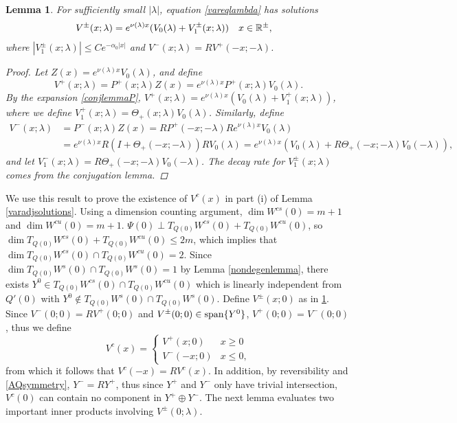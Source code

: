 \documentclass[10pt,reqno]{amsart}
\theoremstyle{plain}
\newtheorem{lemma}[theorem]{Lemma}
\theoremstyle{definition}
\theoremstyle{remark}
\numberwithin{theorem}{section}
\numberwithin{equation}{section}
\begin{document}
\begin{lemma}\label{lemma:Vpm}
For sufficiently small $|\lambda|$, equation \cref{vareqlambda} has solutions
\begin{align}\label{Vpmlambda}
V^\pm(x; \lambda) &= e^{\nu(\lambda)x}(V_0(\lambda) + V_1^\pm(x; \lambda)) && x \in \mathbb{R}^\pm,
\end{align}
where $|V_1^\pm(x; \lambda)| \leq C e^{-\alpha_0 |x|}$ and $V^-(x; \lambda) = R V^+(-x; -\lambda)$.
\begin{proof}
Let $Z(x) = e^{\nu(\lambda)x}V_0(\lambda)$, and define
\begin{equation}\label{defVplus}
V^+(x; \lambda) = P^+(x; \lambda) Z(x) = e^{\nu(\lambda)x}P^+(x; \lambda)V_0(\lambda).
\end{equation}
By the expansion \eqref{conjlemmaP}, $V^+(x; \lambda) = e^{\nu(\lambda)x}( V_0(\lambda) + V_1^+(x; \lambda))$, where we define $V_1^+(x; \lambda) = \Theta_+(x; \lambda) V_0(\lambda)$. Similarly, define 
\begin{align*}
V^-(x; \lambda) &= P^-(x; \lambda) Z(x) = RP^+(-x; -\lambda)R e^{\nu(\lambda)x} V_0(\lambda) \\
&= e^{\nu(\lambda)x} R(I + \Theta_+(-x; -\lambda))R V_0(\lambda) = e^{\nu(\lambda)x}( V_0(\lambda) + R\Theta_+(-x; -\lambda) V_0(-\lambda) ),
\end{align*}
and let $V_1^-(x; \lambda) = R\Theta_+(-x; -\lambda) V_0(-\lambda)$. The decay rate for $V_1^\pm(x; \lambda)$ comes from the conjugation lemma.
\end{proof}
\end{lemma}

We use this result to prove the existence of $V^c(x)$ in part (i) of Lemma \ref{varadjsolutions}. Using a dimension counting argument, $\dim W^{cs}(0) = m + 1$ and $\dim W^{cu}(0) = m + 1$. $\Psi(0) \perp T_{Q(0)}W^{cs}(0) + T_{Q(0)}W^{cu}(0)$, so $\dim T_{Q(0)}W^{cs}(0) + T_{Q(0)}W^{cu}(0) \leq 2m$, which implies that $\dim T_{Q(0)}W^{cs}(0) \cap T_{Q(0)}W^{cu}(0) = 2$. Since $\dim T_{Q(0)}W^s(0) \cap T_{Q(0)}W^s(0) = 1$ by Lemma \ref{nondegenlemma}, there exists $Y^0 \in T_{Q(0)}W^{cs}(0) \cap T_{Q(0)}W^{cu}(0)$ which is linearly independent from $Q'(0)$ with $Y^0 \notin T_{Q(0)}W^s(0) \cap T_{Q(0)}W^s(0)$. Define $V^\pm(x; 0)$ as in \cref{lemma:Vpm}. Since $V^-(0; 0) = R V^+(0; 0)$ and $V^\pm(0; 0) \in \mathop\mathrm{span}\nolimits \{Y^0 \}$, $V^+(0; 0) = V^-(0; 0)$, thus we define 
\[
V^c(x) = \begin{cases}
V^+(x; 0) & x \geq 0 \\
V^-(-x; 0) & x \leq 0,
\end{cases}
\]
from which it follows that $V^c(-x) = R V^c(x)$. In addition, by reversibility and \cref{AQsymmetry}, $Y^- = R Y^+$, thus since $Y^+$ and $Y^-$ only have trivial intersection, $V^c(0)$ can contain no component in $Y^+ \oplus Y^-$. The next lemma evaluates two important inner products involving $V^\pm(0; \lambda)$.
\end{document}
